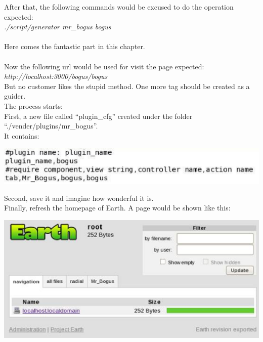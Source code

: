 \documentclass[10pt,oneside]{article}
\begin{document}
After that, the following commands would be excused to do the operation expected:\\
\textit{./script/generator mr\_bogus bogus}\\
\\
Here comes the fantastic part in this chapter.\\
\\
Now the following url would be used for visit the page expected:\\ 
\textit{http://localhost:3000/bogus/bogus}\\ 
But no customer likes the stupid method. One more tag should be created as a guider. \\
The process starts:\\
First, a new file called “plugin\_cfg” created under the folder\\ “./vender/plugins/mr\_bogus”.\\ 
It contains:\\
\begin{center}
 \includegraphics[width=150mm]{fig/asd.eps}\\
\end{center}
Second, save it and imagine how wonderful it is.\\
Finally, refresh the homepage of Earth. A page would be shown like this:\\
\begin{center}
 \includegraphics[width=150mm]{fig/instruction-6.eps}\\
\end{center}
\end{document}
